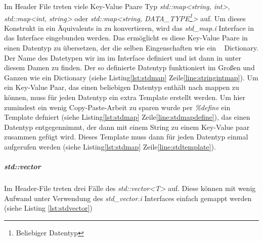 Im Header File treten viele Key-Value Paare Typ \emph{std::map<string, int>}, \emph{std::map<int, string>} oder \emph{std::map<string, DATA\_TYPE\footnote{Beliebiger Datentyp}>} auf. Um dieses Konstrukt in ein Äquivalents in \CS zu konvertieren, wird das \emph{std\_map.i} Interface in das Interface eingebunden werden. Das ermöglicht es diese Key-Value Paare in einen Datentyp zu übersetzen, der die selben Eingenschaften wie ein \CS~ Dictionary. Der Name des Datetypen wir im im Interface definiert und ist dann in \CS unter diesem Damen zu finden. Der so definierte Datentyp funktioniert im Großen und Ganzen wie ein Dictionary (siehe Listing\ref{lst:stdmap} Zeile\ref{line:stringintmap}). Um ein Key-Value Paar, das einen beliebigen Datentyp enthält nach \CS mappen zu können, muss für jeden Datentyp ein extra Template erstellt werden. Um hier zumindest ein wenig Copy-Paste-Arbeit zu sparen wurde per \emph{\%define} ein Template defniert (siehe Listing\ref{lst:stdmap} Zeile\ref{line:stdmapdefine}), das einen Datentyp entgegennimmt, der dann mit einem String zu einem Key-Value paar zusammen gefügt wird. Dieses Template muss dann für jeden Datentyp einmal aufgerufen werden (siehe Listing\ref{lst:stdmap} Zeile\ref{line:stdtemplate}). 

\begin{code}[caption={std::map},label={lst:stdmap}, escapechar=|]

	

\end{code}

\subparagraph{std::vector}

Im Header-File treten drei Fälle des \emph{std::vector<T>} auf. Diese können mit wenig Aufwand unter Verwendung des \emph{std\_vector.i} Interfaces einfach gemappt werden (siehe Listing \ref{lst:stdvector})

\begin{code}[caption={std::map},label={lst:stdvector}, escapechar=|]

\end{code}

